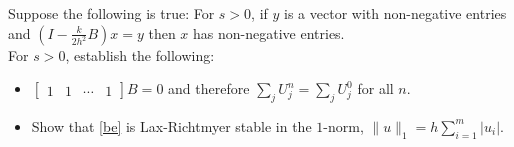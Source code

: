 \documentclass[12pt]{report}
\begin{document}
\newpage



\begin{problem}
    Suppose the following is true: For $s > 0$, if $y$ is a vector with non-negative entries and $\left( I - \frac{k}{2h^2}B \right) x = y$ then $x$ has non-negative entries. \\

  
      \noindent For $s > 0$, establish the following:
       \begin{itemize}
       \item $\begin{bmatrix} 1 & 1 & \cdots & 1 \end{bmatrix} B = 0$ and therefore $\sum_j U_j^n = \sum_j U_j^0$ for all $n$.
         \item  Show that \eqref{be} is Lax-Richtmyer stable in the $1$-norm, $\|u\|_1 = h \sum_{i=1}^m |u_i|$.
    \end{itemize}
\end{problem}
\end{document}
